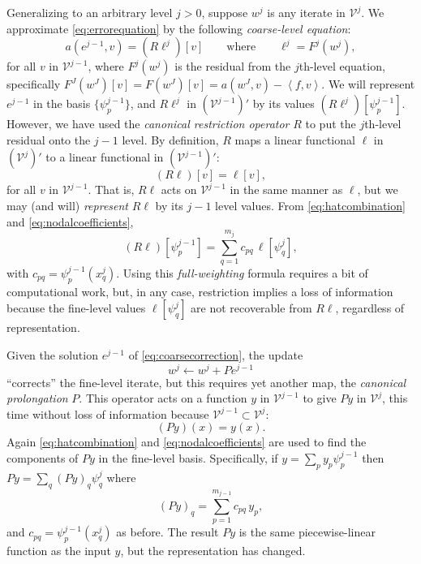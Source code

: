 \documentclass[letterpaper,final,12pt,reqno]{amsart}
\theoremstyle{claim}
\newcommand{\ip}[2]{\left<#1,#2\right>}
\numberwithin{equation}{section}
\numberwithin{figure}{section}
\numberwithin{table}{section}
\numberwithin{theorem}{section}
\begin{document}
Generalizing to an arbitrary level $j>0$, suppose $w^j$ is any iterate in $\mathcal{V}^j$.  We approximate \eqref{eq:errorequation} by the following \emph{coarse-level equation}:
\begin{equation}
  a(e^{j-1},v) = (R\ell^j)[v] \qquad \text{where} \qquad \ell^j = F^j(w^j),  \label{eq:coarsecorrection}
\end{equation}
for all $v$ in $\mathcal{V}^{j-1}$, where $F^j(w^j)$ is the residual from the $j$th-level equation, specifically $F^J(w^J)[v] = F(w^J)[v] = a(w^J,v) - \ip{f}{v}$.  We will represent $e^{j-1}$ in the basis $\{\psi_p^{j-1}\}$, and $R\ell^j$  in $(\mathcal{V}^{j-1})'$ by its values $(R\ell^j)[\psi_p^{j-1}]$.  However, we have used the \emph{canonical restriction operator} $R$ to put the $j$th-level residual onto the $j-1$ level.  By definition, $R$ maps a linear functional $\ell$ in $(\mathcal{V}^j)'$ to a linear functional in $(\mathcal{V}^{j-1})'$:
\begin{equation}
  (R \ell)[v] = \ell[v], \label{eq:canonicalrestriction}
\end{equation}
for all $v$ in $\mathcal{V}^{j-1}$.  That is, $R \ell$ acts on $\mathcal{V}^{j-1}$ in the same manner as $\ell$, but we may (and will) \emph{represent} $R\ell$ by its $j-1$ level values.  From \eqref{eq:hatcombination} and \eqref{eq:nodalcoefficients},
\begin{equation}
  (R \ell)[\psi_p^{j-1}] = \sum_{q=1}^{m_j} c_{pq}\, \ell[\psi_q^j], \label{eq:canonicalrestrictionaction}
\end{equation}
with $c_{pq}=\psi_p^{j-1}(x_q^j)$.  Using this \emph{full-weighting} formula \cite{Briggsetal2000} requires a bit of computational work, but, in any case, restriction implies a loss of information because the fine-level values $\ell[\psi_q^j]$ are not recoverable from $R\ell$, regardless of representation.

Given the solution $e^{j-1}$ of \eqref{eq:coarsecorrection}, the update
\begin{equation}
  w^j \gets w^j + P e^{j-1}  \label{eq:update}
\end{equation}
``corrects'' the fine-level iterate, but this requires yet another map, the \emph{canonical prolongation} $P$.  This operator acts on a function $y$ in $\mathcal{V}^{j-1}$ to give $Py$ in $\mathcal{V}^j$, this time without loss of information because $\mathcal{V}^{j-1} \subset \mathcal{V}^j$:
\begin{equation}
  (P y)(x) = y(x). \label{eq:canonicalprolongation}
\end{equation}
Again \eqref{eq:hatcombination} and \eqref{eq:nodalcoefficients} are used to find the components of $Py$ in the fine-level basis.  Specifically, if $y=\sum_p y_p \psi_p^{j-1}$ then $Py = \sum_q (Py)_q \psi_q^j$ where
\begin{equation}
  (Py)_q = \sum_{p=1}^{m_{j-1}} c_{pq}\, y_p, \label{eq:canonicalprolongationaction}
\end{equation}
and $c_{pq} = \psi_p^{j-1}(x_q^j)$ as before.  The result $P y$ is the same piecewise-linear function as the input $y$, but the representation has changed.
\end{document}
